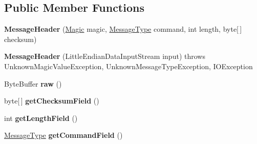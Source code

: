 \subsection*{Public Member Functions}
\begin{DoxyCompactItemize}
\item 
\hypertarget{classorg_1_1coinjuice_1_1message_1_1_message_header_acd384f800accf7f3a5d7d46ce668eda5}{{\bfseries Message\-Header} (\hyperlink{enumorg_1_1coinjuice_1_1message_1_1_message_header_1_1_magic}{Magic} magic, \hyperlink{enumorg_1_1coinjuice_1_1message_1_1_message_type}{Message\-Type} command, int length, byte\mbox{[}$\,$\mbox{]} checksum)}\label{classorg_1_1coinjuice_1_1message_1_1_message_header_acd384f800accf7f3a5d7d46ce668eda5}

\item 
\hypertarget{classorg_1_1coinjuice_1_1message_1_1_message_header_a2d5815585516993708d104a705d71217}{{\bfseries Message\-Header} (Little\-Endian\-Data\-Input\-Stream input)  throws Unknown\-Magic\-Value\-Exception, Unknown\-Message\-Type\-Exception, I\-O\-Exception }\label{classorg_1_1coinjuice_1_1message_1_1_message_header_a2d5815585516993708d104a705d71217}

\item 
\hypertarget{classorg_1_1coinjuice_1_1message_1_1_message_header_a62ce86a688c32a95c337f3115282e56d}{Byte\-Buffer {\bfseries raw} ()}\label{classorg_1_1coinjuice_1_1message_1_1_message_header_a62ce86a688c32a95c337f3115282e56d}

\item 
\hypertarget{classorg_1_1coinjuice_1_1message_1_1_message_header_a9494a2dad63b3e41cb9cd6654551126a}{byte\mbox{[}$\,$\mbox{]} {\bfseries get\-Checksum\-Field} ()}\label{classorg_1_1coinjuice_1_1message_1_1_message_header_a9494a2dad63b3e41cb9cd6654551126a}

\item 
\hypertarget{classorg_1_1coinjuice_1_1message_1_1_message_header_a1b6da0ea4bc0061c24a4ac63ec6d12a3}{int {\bfseries get\-Length\-Field} ()}\label{classorg_1_1coinjuice_1_1message_1_1_message_header_a1b6da0ea4bc0061c24a4ac63ec6d12a3}

\item 
\hypertarget{classorg_1_1coinjuice_1_1message_1_1_message_header_ad902c489cb9a885ce64cf637403fb8af}{\hyperlink{enumorg_1_1coinjuice_1_1message_1_1_message_type}{Message\-Type} {\bfseries get\-Command\-Field} ()}\label{classorg_1_1coinjuice_1_1message_1_1_message_header_ad902c489cb9a885ce64cf637403fb8af}

\end{DoxyCompactItemize}
